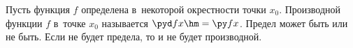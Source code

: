 
    Пусть функция $f$ определена в~некоторой окрестности точки $x_0$. Производной функции $f$ в~точке $x_0$ называется
    $\pyd fx\hm=\py fx$. Предел может быть или не быть. Если не будет предела, то и не будет производной.
